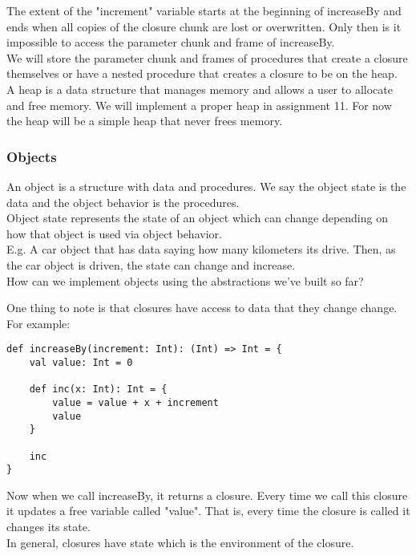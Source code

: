 \documentclass[12pt, letterpaper]{article}
\begin{document}
The extent of the "increment" variable starts at the beginning of increaseBy and ends when all copies of the closure chunk are lost or overwritten. Only then is it impossible to access the parameter chunk and frame of increaseBy.\\

We will store the parameter chunk and frames of procedures that create a closure themselves or have a nested procedure that creates a closure to be on the heap.\\

A heap is a data structure that manages memory and allows a user to allocate and free memory. We will implement a proper heap in assignment 11. For now the heap will be a simple heap that never frees memory.\\

\subsubsection{Objects}
An object is a structure with data and procedures. We say the object state is the data and the object behavior is the procedures.\\

Object state represents the state of an object which can change depending on how that object is used via object behavior.\\

E.g. A car object that has data saying how many kilometers its drive. Then, as the car object is driven, the state can change and increase.\\

How can we implement objects using the abstractions we've built so far?

One thing to note is that closures have access to data that they change change. For example:
\begin{lstlisting}
def increaseBy(increment: Int): (Int) => Int = {
	val value: Int = 0
	
	def inc(x: Int): Int = {
		value = value + x + increment
		value
	}
	
	inc
}
\end{lstlisting}
Now when we call increaseBy, it returns a closure. Every time we call this closure it updates a free variable called "value". That is, every time the closure is called it changes its state.\\

In general, closures have state which is the environment of the closure.\\
\end{document}
